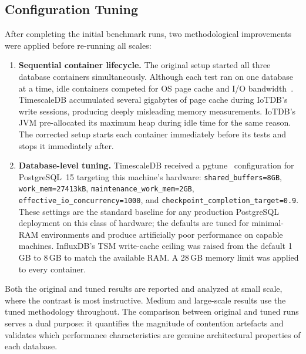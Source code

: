 \subsection{Configuration Tuning}
\label{sec:tuning}

After completing the initial benchmark runs, two methodological improvements were applied
before re-running all scales:

\begin{enumerate}
  \item \textbf{Sequential container lifecycle.} The original setup started all three
    database containers simultaneously. Although each test ran on one database at a time, idle
    containers competed for OS page cache and I/O bandwidth~\citep{shapira2016pitfalls}. TimescaleDB accumulated several
    gigabytes of page cache during IoTDB's write sessions, producing deeply misleading memory
    measurements. IoTDB's JVM pre-allocated its maximum heap during idle time for the same reason.
    The corrected setup starts each container immediately before its tests and stops it
    immediately after.

  \item \textbf{Database-level tuning.} TimescaleDB received a pgtune~\cite{pgtune}
    configuration for PostgreSQL~15 targeting this machine's hardware:
    \texttt{shared\_buffers=8GB}, \texttt{work\_mem=27413kB},
    \texttt{maintenance\_work\_mem=2GB}, \texttt{effective\_io\_concurrency=1000}, and
    \texttt{checkpoint\_completion\_target=0.9}. These settings are the standard baseline for
    any production PostgreSQL deployment on this class of hardware; the defaults are tuned
    for minimal-RAM environments and produce artificially poor performance on capable machines.
    InfluxDB's TSM write-cache ceiling was raised from the default 1\,GB to 8\,GB to match the
    available RAM. A 28\,GB memory limit was applied to every container.
\end{enumerate}

Both the original and tuned results are reported and analyzed at small scale, where the
contrast is most instructive. Medium and large-scale results use the tuned methodology
throughout. The comparison between original and tuned runs serves a dual purpose: it
quantifies the magnitude of contention artefacts and validates which performance
characteristics are genuine architectural properties of each database.
